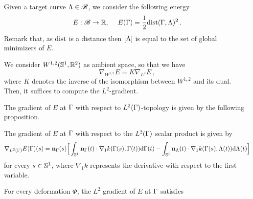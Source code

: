 

Given a target curve $\Lambda\in \mathcal{B}$, we consider the following energy 
\begin{equation}\label{energy}
	E : \Bb \rightarrow \RR, \; \quad E(\GA) = \frac{1}{2} {\rm dist}(\GA,\La)^2 \,.%
\end{equation} 
Remark that, as $\rm{dist}$ is a distance then $[\Lambda]$ is equal to the set of global minimizers of $E$.

We consider $W^{1,2}(\mathbb{S}^1,\mathbb{R}^2)$ as ambient space, so that  we have 
\begin{equation}\label{grad-sob}
\nabla_{W^{1,2}} E = K \nabla_{L^2} E\,,
\end{equation}
where  $K$ denotes the inverse of the isomorphism between $W^{1,2}$ and its dual. Then, it suffices to compute the $L^2 $-gradient.

The gradient of $E$ at $\Gamma$ with respect to  $L^2(\Gamma)$-topology is given by the following proposition.

\begin{prop}
The gradient of $E$ at $\Gamma$ with respect to the $L^2(\Gamma)$ scalar product is given by
\begin{equation}\label{gradient-cont-l2}
	\nabla_{L^{2}(\Gamma)} E(\Gamma)(s) = 
	\mathbf{n}_\Gamma(s) \Big[\int_{\mathbb{S}^1} 
		\mathbf{n}_\Gamma(t) \cdot \nabla_1 k(\Gamma(s),\Gamma(t)) \mathrm{d} \Gamma(t)  - \int_{\mathbb{S}^1} 
		\mathbf{n}_{\Lambda}(t) \cdot \nabla_1 k(\Gamma(s),\Lambda(t)) 
		\mathrm{d} \Lambda(t) \Big] 
\end{equation}
for every $s\in \mathbb{S}^1$, where $\nabla_1 k$ represents the derivative with respect to the first variable.

For every deformation $\Phi$, the $L^2$ gradient of $E$ at $\Gamma$ satisfies 


\end{prop}

